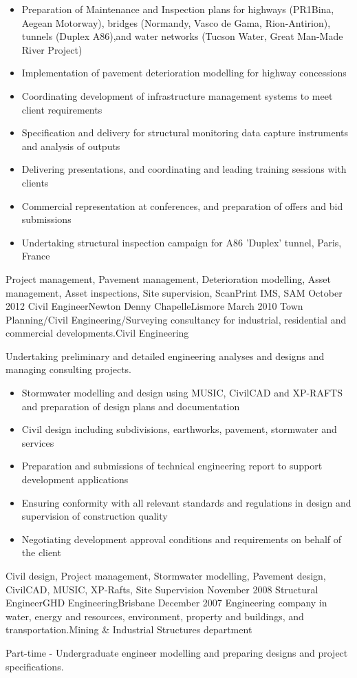 \begin{experiences}
{\begin{itemize}
		\item Preparation of Maintenance and Inspection plans for highways (PR1Bina, Aegean Motorway), bridges (Normandy, Vasco de Gama, Rion-Antirion), tunnels (Duplex A86),and water networks (Tucson Water, Great Man-Made River Project) 
		\item Implementation of pavement deterioration modelling for highway concessions
		\item Coordinating development of infrastructure management systems to meet client requirements
   		\item Specification and delivery for structural monitoring data capture instruments and analysis of outputs
		\item Delivering presentations, and coordinating and leading training sessions with clients
		\item Commercial representation at conferences, and preparation of offers and bid submissions
		\item Undertaking structural inspection campaign for A86 'Duplex' tunnel, Paris, France
                      \end{itemize}
                    }
                    {Project management, Pavement management, Deterioration modelling, Asset management, Asset inspections, Site supervision, ScanPrint IMS, SAM}
  \emptySeparator
  \consultantexperience
  {October 2012}       {Civil Engineer}{Newton Denny Chapelle}{Lismore}
  {March 2010}      {Town Planning/Civil Engineering/Surveying consultancy for industrial, residential and commercial developments.}{Civil Engineering}
                    {Undertaking preliminary and detailed engineering analyses and designs and managing consulting projects.
           \begin{itemize}

		\item Stormwater modelling and design using MUSIC, CivilCAD and XP-RAFTS and preparation of design plans and documentation
		\item Civil design including subdivisions, earthworks, pavement, stormwater and services
		\item Preparation and submissions of technical engineering report to support development applications
		\item Ensuring conformity with all relevant standards and regulations in design and supervision of construction quality   
		\item Negotiating development approval conditions and requirements on behalf of the client
               \end{itemize}
                    }
                    {Civil design, Project management, Stormwater modelling, Pavement design, CivilCAD, MUSIC, XP-Rafts, Site Supervision}
  \emptySeparator
  \consultantexperience
  {November 2008}      {Structural Engineer}{GHD Engineering}{Brisbane}
  {December 2007}      {Engineering company in water, energy and resources, environment, property and buildings, and transportation.}{Mining \& Industrial Structures department}
   { Part-time - Undergraduate engineer modelling and preparing designs and project specifications.
                    
}
\end{experiences}
